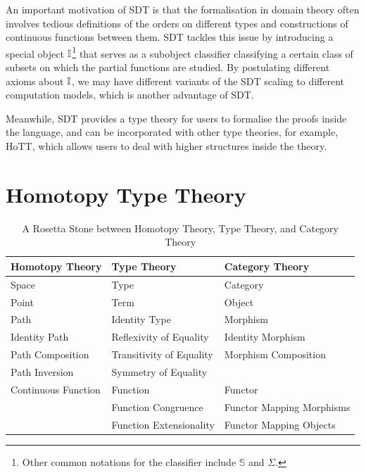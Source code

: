An important motivation of SDT is that the formalisation in domain theory often involves tedious definitions of the orders on different types and constructions of continuous functions between them. SDT tackles this issue by introducing a special object $\mathbb{I}$\footnote{Other common notations for the classifier include $\mathbb{S}$ and $\Sigma$.} that serves as a subobject classifier classifying a certain class of subsets on which the partial functions are studied. By postulating different axioms about $\mathbb{I}$, we may have different variants of the SDT scaling to different computation models, which is another advantage of SDT.

Meanwhile, SDT provides a type theory for users to formalise the proofs inside the language, and can be incorporated with other type theories, for example, HoTT\cite{the_univalent_foundations_program_homotopy_2013}, which allows users to deal with higher structures inside the theory.

\section{Homotopy Type Theory}

\begin{table}[h]
    \centering
    \begin{tabular}{l|l|l}
    \textbf{Homotopy Theory} & \textbf{Type Theory} & \textbf{Category Theory} \\ \hline
    Space & Type & Category \\ \hline
    Point & Term & Object \\ \hline
    Path & Identity Type & Morphism \\ \hline
    Identity Path & Reflexivity of Equality & Identity Morphism \\ \hline
    Path Composition & Transitivity of Equality & Morphism Composition \\ \hline
    Path Inversion & Symmetry of Equality &  \\ \hline
    Continuous Function & Function & Functor \\ \hline
    & Function Congruence & Functor Mapping Morphisms \\ \hline
    & Function Extensionality & Functor Mapping Objects \\ 
    \end{tabular}
    \caption{A Rosetta Stone between Homotopy Theory, Type Theory, and Category Theory}
    \label{tab-rosetta}
\end{table}

